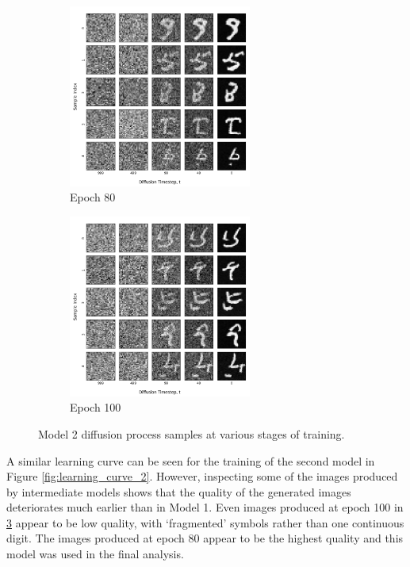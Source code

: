 \documentclass[12pt]{article}
\begin{document}
\begin{figure}[hp]
    \begin{subfigure}{0.49\textwidth}
    \includegraphics[width=0.9\linewidth, height=6cm, center]{figures/diffusion_plot_2_0080.png}
    \caption{Epoch 80}
    \label{fig:2_80}
    \end{subfigure}
    \begin{subfigure}{0.49\textwidth}
    \includegraphics[width=0.9\linewidth, height=6cm, center]{figures/diffusion_plot_2_0100.png}
    \caption{Epoch 100}
    \label{fig:2_100}
    \end{subfigure}

    \caption{Model 2 diffusion process samples at various stages of training.}
    \label{fig:diffusion_2}
\end{figure}

A similar learning curve can be seen for the training of the second model in Figure \ref{fig:learning_curve_2}.
However, inspecting some of the images produced by intermediate models shows that the quality of the generated images deteriorates much earlier than in Model 1.
Even images produced at epoch 100 in \ref{fig:diffusion_2} appear to be low quality, with `fragmented' symbols rather than one continuous digit.
The images produced at epoch 80 appear to be the highest quality and this model was used in the final analysis.
\end{document}
